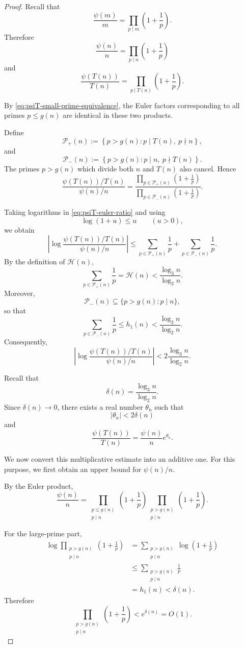 \documentclass{article}
\begin{document}
\begin{proof}
Recall that
\[
\frac{\psi(m)}m
=
\prod_{p\mid m}
\left(1+\frac1p\right).
\]
Therefore
\[
\frac{\psi(n)}n
=
\prod_{p\mid n}
\left(1+\frac1p\right)
\]
and
\[
\frac{\psi(T(n))}{T(n)}
=
\prod_{p\mid T(n)}
\left(1+\frac1p\right).
\]

By \eqref{eq:psiT-small-prime-equivalence}, the Euler factors
corresponding to all primes $p\le g(n)$ are identical in these two
products.

Define
\[
\mathcal P_+(n)
:=
\left\{
p>g(n):
p\mid T(n),\ p\nmid n
\right\},
\]
and
\[
\mathcal P_-(n)
:=
\left\{
p>g(n):
p\mid n,\ p\nmid T(n)
\right\}.
\]
The primes $p>g(n)$ which divide both $n$ and $T(n)$ also cancel.
Hence
\begin{equation}
\frac{\psi(T(n))/T(n)}
{\psi(n)/n}
=
\frac{
\displaystyle
\prod_{p\in\mathcal P_+(n)}
\left(1+\frac1p\right)}
{
\displaystyle
\prod_{p\in\mathcal P_-(n)}
\left(1+\frac1p\right)}.
\label{eq:psiT-euler-ratio}
\end{equation}

Taking logarithms in \eqref{eq:psiT-euler-ratio} and using
\[
\log(1+u)\le u
\qquad(u>0),
\]
we obtain
\[
\left|
\log
\frac{\psi(T(n))/T(n)}
{\psi(n)/n}
\right|
\le
\sum_{p\in\mathcal P_+(n)}\frac1p
+
\sum_{p\in\mathcal P_-(n)}\frac1p.
\]
By the definition of $\mathcal H(n)$,
\[
\sum_{p\in\mathcal P_+(n)}\frac1p
=
\mathcal H(n)
<
\frac{\log_3n}{\log_2n}.
\]
Moreover,
\[
\mathcal P_-(n)
\subseteq
\{p>g(n):p\mid n\},
\]
so that
\[
\sum_{p\in\mathcal P_-(n)}\frac1p
\le
h_1(n)
<
\frac{\log_3n}{\log_2n}.
\]
Consequently,
\begin{equation}
\left|
\log
\frac{\psi(T(n))/T(n)}
{\psi(n)/n}
\right|
<
2\frac{\log_3n}{\log_2n}.
\label{eq:psiT-log-bound}
\end{equation}

Recall that
\[
\delta(n)
=
\frac{\log_3n}{\log_2n}.
\]
Since $\delta(n)\to0$, there exists a real number $\theta_n$ such
that
\[
|\theta_n|<2\delta(n)
\]
and
\[
\frac{\psi(T(n))}{T(n)}
=
\frac{\psi(n)}n e^{\theta_n}.
\]

We now convert this multiplicative estimate into an additive one.
For this purpose, we first obtain an upper bound for $\psi(n)/n$.

By the Euler product,
\[
\frac{\psi(n)}n
=
\prod_{\substack{p\le g(n)\\p\mid n}}
\left(1+\frac1p\right)
\prod_{\substack{p>g(n)\\p\mid n}}
\left(1+\frac1p\right).
\]

For the large-prime part,
\[
\begin{aligned}
\log
\prod_{\substack{p>g(n)\\p\mid n}}
\left(1+\frac1p\right)
&=
\sum_{\substack{p>g(n)\\p\mid n}}
\log\left(1+\frac1p\right)\\
&\le
\sum_{\substack{p>g(n)\\p\mid n}}\frac1p\\
&=
h_1(n)
<
\delta(n).
\end{aligned}
\]
Therefore
\[
\prod_{\substack{p>g(n)\\p\mid n}}
\left(1+\frac1p\right)
<
e^{\delta(n)}
=
O(1).
\]


\end{proof}
\end{document}
